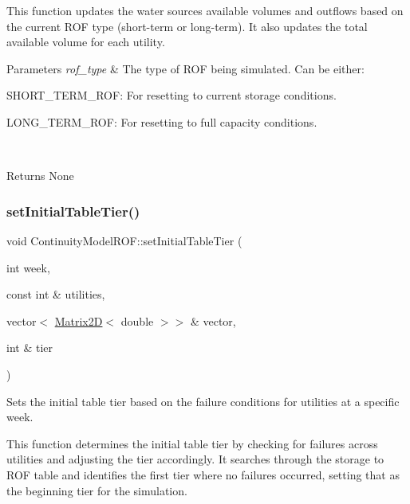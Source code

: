 This function updates the water sources\textquotesingle{} available volumes and outflows based on the current R\+OF type (short-\/term or long-\/term). It also updates the total available volume for each utility.


\begin{DoxyParams}{Parameters}
{\em rof\+\_\+type} & The type of R\+OF being simulated. Can be either\+:
\begin{DoxyItemize}
\item {\ttfamily S\+H\+O\+R\+T\+\_\+\+T\+E\+R\+M\+\_\+\+R\+OF}\+: For resetting to current storage conditions.
\item {\ttfamily L\+O\+N\+G\+\_\+\+T\+E\+R\+M\+\_\+\+R\+OF}\+: For resetting to full capacity conditions.
\end{DoxyItemize}\\
\hline
\end{DoxyParams}
\begin{DoxyReturn}{Returns}
None 
\end{DoxyReturn}
\mbox{\label{classContinuityModelROF_a0c46d5905f5d0ae2cf0abd0d4653bbc7}} 
\subsubsection{\texorpdfstring{set\+Initial\+Table\+Tier()}{setInitialTableTier()}}
{\footnotesize\ttfamily void Continuity\+Model\+R\+O\+F\+::set\+Initial\+Table\+Tier (\begin{DoxyParamCaption}\item[{int}]{week,  }\item[{const int \&}]{utilities,  }\item[{vector$<$ \mbox{\hyperlink{classMatrix2D}{Matrix2D}}$<$ double $>$$>$ \&}]{vector,  }\item[{int \&}]{tier }\end{DoxyParamCaption})}



Sets the initial table tier based on the failure conditions for utilities at a specific week. 

This function determines the initial table tier by checking for failures across utilities and adjusting the tier accordingly. It searches through the storage to R\+OF table and identifies the first tier where no failures occurred, setting that as the beginning tier for the simulation.


